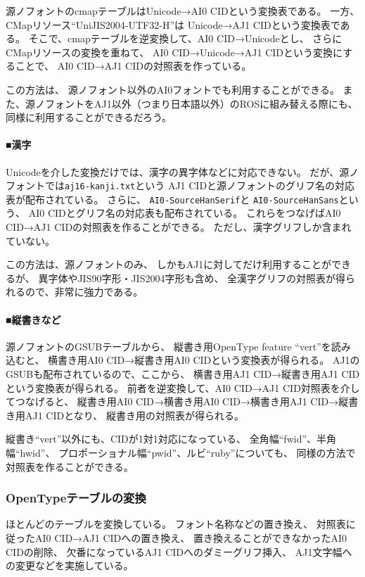 源ノフォントのcmapテーブルはUnicode→AI0 CIDという変換表である。
一方、CMapリソース``UniJIS2004-UTF32-H''は
Unicode→AJ1 CIDという変換表である。
そこで、cmapテーブルを逆変換して、AI0 CID→Unicodeとし、
さらにCMapリソースの変換を重ねて、
AI0 CID→Unicode→AJ1 CIDという変換にすることで、
AI0 CID→AJ1 CIDの対照表を作っている。

この方法は、
源ノフォント以外のAI0フォントでも利用することができる。
また、源ノフォントをAJ1以外（つまり日本語以外）のROSに組み替える際にも、
同様に利用することができるだろう。

\paragraph{■漢字}

Unicodeを介した変換だけでは、漢字の異字体などに対応できない。
だが、源ノフォントでは\texttt{aj16-kanji.txt}という
AJ1 CIDと源ノフォントのグリフ名の対応表が配布されている。
さらに、
\texttt{AI0-SourceHanSerif}と
\texttt{AI0-SourceHanSans}という、
AI0 CIDとグリフ名の対応表も配布されている。
これらをつなげばAI0 CID→AJ1 CIDの対照表を作ることができる。
ただし、漢字グリフしか含まれていない。

この方法は、源ノフォントのみ、
しかもAJ1に対してだけ利用することができるが、
異字体やJIS90字形・JIS2004字形も含め、
全漢字グリフの対照表が得られるので、非常に強力である。

\paragraph{■縦書きなど}

源ノフォントのGSUBテーブルから、
縦書き用OpenType feature ``vert''を読み込むと、
横書き用AI0 CID→縦書き用AI0 CIDという変換表が得られる。
AJ1のGSUBも配布されている\cite{aj1}ので、ここから、
横書き用AJ1 CID→縦書き用AJ1 CIDという変換表が得られる。
前者を逆変換して、AI0 CID→AJ1 CID対照表を介してつなげると、
縦書き用AI0 CID→横書き用AI0 CID→横書き用AJ1 CID→縦書き用AJ1 CIDとなり、
縦書き用の対照表が得られる。

縦書き``vert''以外にも、CIDが1対1対応になっている、
全角幅``fwid''、半角幅``hwid''、
プロポーショナル幅``pwid''、ルビ``ruby''についても、
同様の方法で対照表を作ることができる。

\subsubsection{OpenTypeテーブルの変換}

ほとんどのテーブルを変換している。
フォント名称などの置き換え、
対照表に従ったAI0 CID→AJ1 CIDへの置き換え、
置き換えることができなかったAI0 CIDの削除、
欠番になっているAJ1 CIDへのダミーグリフ挿入、
AJ1文字幅への変更などを実施している。

